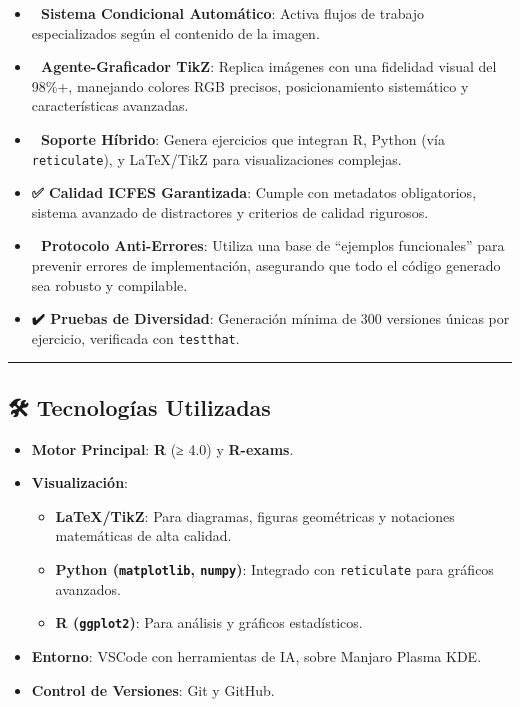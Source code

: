 \documentclass[
]{article}
\providecommand{\tightlist}{%
  \setlength{\itemsep}{0pt}\setlength{\parskip}{0pt}}
\begin{document}
\begin{itemize}
\tightlist
\item
  \textbf{🤖 Sistema Condicional Automático}: Activa flujos de trabajo
  especializados según el contenido de la imagen.
\item
  \textbf{🎨 Agente-Graficador TikZ}: Replica imágenes con una fidelidad
  visual del 98\%+, manejando colores RGB precisos, posicionamiento
  sistemático y características avanzadas.
\item
  \textbf{🧩 Soporte Híbrido}: Genera ejercicios que integran R, Python
  (vía \texttt{reticulate}), y LaTeX/TikZ para visualizaciones
  complejas.
\item
  \textbf{✅ Calidad ICFES Garantizada}: Cumple con metadatos
  obligatorios, sistema avanzado de distractores y criterios de calidad
  rigurosos.
\item
  \textbf{🔧 Protocolo Anti-Errores}: Utiliza una base de ``ejemplos
  funcionales'' para prevenir errores de implementación, asegurando que
  todo el código generado sea robusto y compilable.
\item
  \textbf{✔️ Pruebas de Diversidad}: Generación mínima de 300 versiones
  únicas por ejercicio, verificada con \texttt{testthat}.
\end{itemize}

\begin{center}\rule{0.5\linewidth}{0.5pt}\end{center}

\subsection{\texorpdfstring{🛠️ \textbf{Tecnologías
Utilizadas}}{🛠️ Tecnologías Utilizadas}}\label{tecnologuxedas-utilizadas}

\begin{itemize}
\tightlist
\item
  \textbf{Motor Principal}: \textbf{R} (≥ 4.0) y \textbf{R-exams}.
\item
  \textbf{Visualización}:

  \begin{itemize}
  \tightlist
  \item
    \textbf{LaTeX/TikZ}: Para diagramas, figuras geométricas y
    notaciones matemáticas de alta calidad.
  \item
    \textbf{Python (\texttt{matplotlib}, \texttt{numpy})}: Integrado con
    \texttt{reticulate} para gráficos avanzados.
  \item
    \textbf{R (\texttt{ggplot2})}: Para análisis y gráficos
    estadísticos.
  \end{itemize}
\item
  \textbf{Entorno}: VSCode con herramientas de IA, sobre Manjaro Plasma
  KDE.
\item
  \textbf{Control de Versiones}: Git y GitHub.
\end{itemize}
\end{document}
